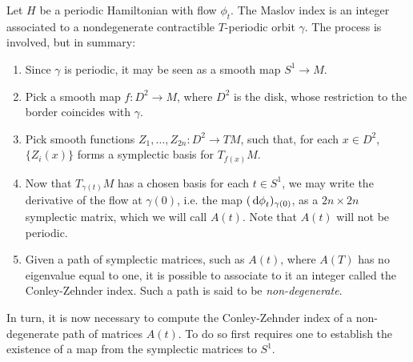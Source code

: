 Let $H$ be a periodic Hamiltonian with flow $\phi_t$. The Maslov index is an integer associated to a nondegenerate contractible $T$-periodic orbit $\gamma$. The process is involved, but in summary:
\begin{algorithm}\label{alg:maslovalg}
\begin{enumerate}[algorithm]
\item\label{maslovalg:step1} Since $\gamma$ is periodic, it may be seen as a smooth map $S^1 \to M$.
\item\label{maslovalg:step2} Pick a smooth map $f \colon D^2 \to M$, where $D^2$ is the disk, whose restriction to the border coincides with $\gamma$.
\item\label{maslovalg:step3} Pick smooth functions $Z_1, \dots, Z_{2n} \colon D^2 \to TM$, such that, for each $x 	\in D^2$, $\{Z_i(x)\}$ forms a symplectic basis for $T_{f(x)} M$.
\item\label{maslovalg:step4} Now that $T_{\gamma(t)} M$ has a chosen basis for each $t \in S^1$, we may write the derivative of the flow at $\gamma(0)$, i.e. the map $(\dl \phi_t)_{\gamma(0)}$, as a $2n \times 2n$ symplectic matrix, which we will call $A(t)$. Note that $A(t)$ will not be periodic.
\item\label{maslovalg:step5} Given a path of symplectic matrices, such as $A(t)$, where $A(T)$ has no eigenvalue equal to one, it is possible to associate to it an integer called the Conley-Zehnder index. Such a path is said to be \emph{non-degenerate}.
\end{enumerate}
\end{algorithm}

In turn, it is now necessary to compute the Conley-Zehnder index of a non-degenerate path of matrices $A(t)$. To do so first requires one to establish the existence of a map from the symplectic matrices to $S^1$.

